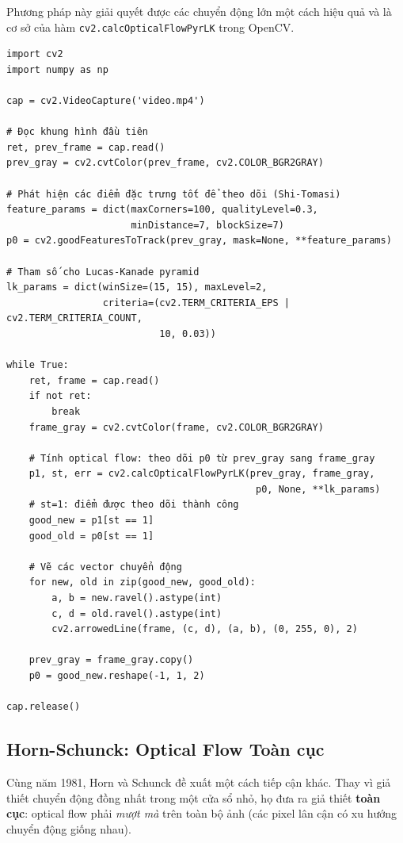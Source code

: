 Phương pháp này giải quyết được các chuyển động lớn một cách hiệu quả và là cơ sở của hàm \texttt{cv2.calcOpticalFlowPyrLK} trong OpenCV.

\begin{verbatim}
import cv2
import numpy as np

cap = cv2.VideoCapture('video.mp4')

# Đọc khung hình đầu tiên
ret, prev_frame = cap.read()
prev_gray = cv2.cvtColor(prev_frame, cv2.COLOR_BGR2GRAY)

# Phát hiện các điểm đặc trưng tốt để theo dõi (Shi-Tomasi)
feature_params = dict(maxCorners=100, qualityLevel=0.3,
                      minDistance=7, blockSize=7)
p0 = cv2.goodFeaturesToTrack(prev_gray, mask=None, **feature_params)

# Tham số cho Lucas-Kanade pyramid
lk_params = dict(winSize=(15, 15), maxLevel=2,
                 criteria=(cv2.TERM_CRITERIA_EPS | cv2.TERM_CRITERIA_COUNT,
                           10, 0.03))

while True:
    ret, frame = cap.read()
    if not ret:
        break
    frame_gray = cv2.cvtColor(frame, cv2.COLOR_BGR2GRAY)

    # Tính optical flow: theo dõi p0 từ prev_gray sang frame_gray
    p1, st, err = cv2.calcOpticalFlowPyrLK(prev_gray, frame_gray,
                                            p0, None, **lk_params)
    # st=1: điểm được theo dõi thành công
    good_new = p1[st == 1]
    good_old = p0[st == 1]

    # Vẽ các vector chuyển động
    for new, old in zip(good_new, good_old):
        a, b = new.ravel().astype(int)
        c, d = old.ravel().astype(int)
        cv2.arrowedLine(frame, (c, d), (a, b), (0, 255, 0), 2)

    prev_gray = frame_gray.copy()
    p0 = good_new.reshape(-1, 1, 2)

cap.release()
\end{verbatim}

\subsection{Horn-Schunck: Optical Flow Toàn cục}
\label{subsec:horn_schunck}

Cùng năm 1981, Horn và Schunck \cite{HornSchunck1981} đề xuất một cách tiếp cận khác. Thay vì giả thiết chuyển động đồng nhất trong một cửa sổ nhỏ, họ đưa ra giả thiết \textbf{toàn cục}: optical flow phải \textit{mượt mà} trên toàn bộ ảnh (các pixel lân cận có xu hướng chuyển động giống nhau).

